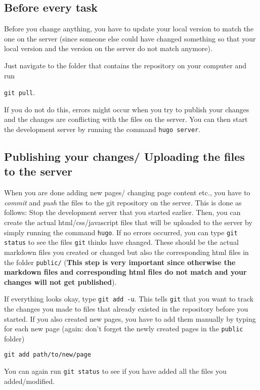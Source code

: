 \documentclass[a4paper,parskip=half]{scrartcl}
\begin{document}
\subsection{Before every task}
Before you change anything, you have to update your local version to match the
one on the server (since someone else could have changed something so that your
local version and the version on the server do not match anymore).

Just navigate to the folder that contains the repository on your computer and
run
\begin{center}
  \texttt{git pull}.
\end{center}
If you do not do this, errors might occur when you try to publish your changes
and the changes are conflicting with the files on the server. You can then start
the development server by running the command \texttt{hugo server}.

\subsection{Publishing your changes/ Uploading the files to the server}
When you are done adding new pages/ changing page content etc., you have to
\emph{commit} and \emph{push} the files to the git repository on the server.
This is done as follows: Stop the development server that you started earlier.
Then, you can create the actual html/css/javascript files that will be uploaded
to the server by simply running the command \texttt{hugo}. If no errors
occurred, you can type \texttt{git status} to see the files \texttt{git} thinks
have changed.  These should be the actual markdown files you created or changed
but also the corresponding html files in the folder \texttt{public/}
(\textbf{This step is very important since otherwise the markdown files and
  corresponding html files do not match and your changes will not get
  published}).

If everything looks okay, type \texttt{git add -u}. This tells \texttt{git} that
you want to track the changes you made to files that already existed in the
repository before you started. If you also created new pages, you have to add
them manually by typing for each new page (again: don't forget the newly created
pages in the \texttt{public} folder)
\begin{center}
  \texttt{git add path/to/new/page}
\end{center}
You can again run \texttt{git status} to see if you have added all the files you
added/modified.
\end{document}
